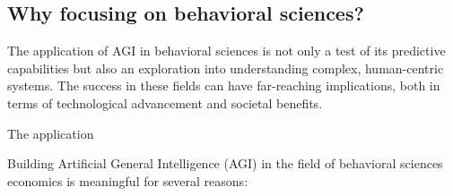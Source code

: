 \documentclass[11pt, reqno]{amsart}
\theoremstyle{definition}
\theoremstyle{remark}
\begin{document}
  \subsection{Why focusing on behavioral sciences?}

  The application of AGI in behavioral sciences is not only a test of its predictive
  capabilities but also an exploration into understanding complex, human-centric
  systems. The success in these fields can have far-reaching implications, both
  in terms of technological advancement and societal benefits.

  The application 

  Building Artificial General Intelligence (AGI) in the field of behavioral sciences
  economics is meaningful for several reasons:
\end{document}
